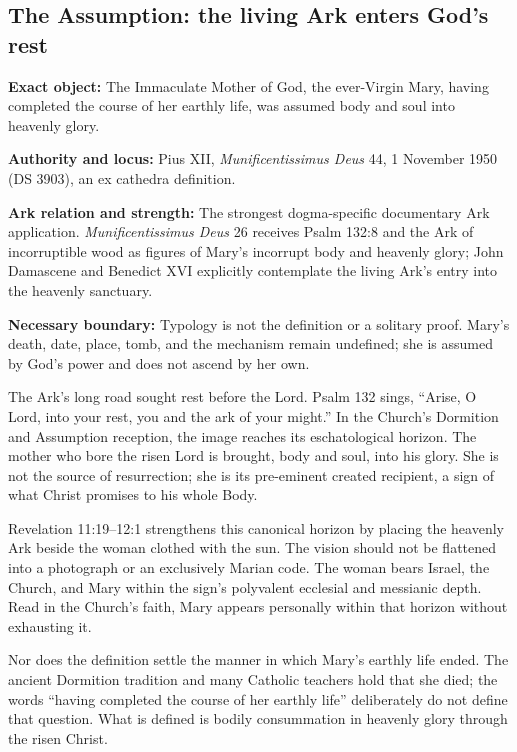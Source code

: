 \subsection{The Assumption: the living Ark enters God's rest}

\begin{studyframe}
\textbf{Exact object:} The Immaculate Mother of God, the ever-Virgin Mary,
having completed the course of her earthly life, was assumed body and soul
into heavenly glory.\par
\textbf{Authority and locus:} Pius XII, \emph{Munificentissimus Deus} 44,
1 November 1950 (DS 3903), an ex cathedra definition.\par
\textbf{Ark relation and strength:} The strongest dogma-specific documentary
Ark application.  \emph{Munificentissimus Deus} 26 receives Psalm 132:8 and
the Ark of incorruptible wood as figures of Mary's incorrupt body and heavenly
glory; John Damascene and Benedict XVI explicitly contemplate the living Ark's
entry into the heavenly sanctuary.\par
\textbf{Necessary boundary:} Typology is not the definition or a solitary
proof.  Mary's death, date, place, tomb, and the mechanism remain undefined;
she is assumed by God's power and does not ascend by her own.
\end{studyframe}

The Ark's long road sought rest before the Lord.  Psalm 132 sings, ``Arise,
O Lord, into your rest, you and the ark of your might.''  In the Church's
Dormition and Assumption reception, the image reaches its eschatological
horizon.  The mother who bore the risen Lord is brought, body and soul, into
his glory.  She is not the source of resurrection; she is its pre-eminent
created recipient, a sign of what Christ promises to his whole Body.

Revelation 11:19--12:1 strengthens this canonical horizon by placing the
heavenly Ark beside the woman clothed with the sun.  The vision should not be
flattened into a photograph or an exclusively Marian code.  The woman bears
Israel, the Church, and Mary within the sign's polyvalent ecclesial and
messianic depth.  Read in the Church's faith, Mary appears personally within
that horizon without exhausting it.

Nor does the definition settle the manner in which Mary's earthly life ended.
The ancient Dormition tradition and many Catholic teachers hold that she died;
the words ``having completed the course of her earthly life'' deliberately do
not define that question.  What is defined is bodily consummation in heavenly
glory through the risen Christ.

